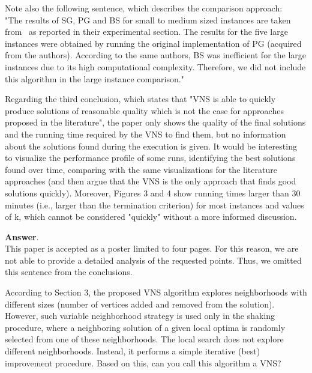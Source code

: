 \documentclass [11pt]{scrartcl}
\begin{document}
\begin{enumerate}
	Note also the following sentence, which describes the comparison approach:\\
	"The results of SG, PG and BS for small to medium sized instances are taken from~\cite{corcoran2021heuristics} as reported in their experimental section. The results for the five large instances were obtained by running the original implementation of PG (acquired from the authors). According to the same authors, BS was inefficient for the large instances due to its high computational complexity. Therefore, we did not include this algorithm in the large instance comparison."
	
	\textbf{Answer}. \\
	This paper is accepted as a poster limited to four pages. For this reason, we are not able to provide a detailed analysis of the requested points. Thus, we omitted this sentence from the conclusions. 
\end{enumerate}

\begin{leftbar}	
According to Section 3, the proposed VNS algorithm explores neighborhoods with different sizes (number of vertices added and removed from the solution). However, such variable neighborhood strategy is used only in the shaking procedure, where a neighboring solution of a given local optima is randomly selected from one of these neighborhoods. The local search does not explore different neighborhoods. Instead, it performs a simple iterative (best) improvement procedure. Based on this, can you call this algorithm a VNS?
\end{leftbar}
\end{document}
